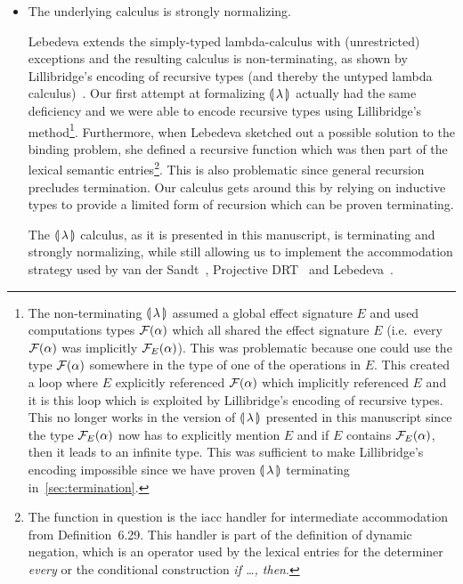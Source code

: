 \begin{itemize}
\item The underlying calculus is strongly normalizing.

  Lebedeva extends the simply-typed lambda-calculus with (unrestricted)
  exceptions and the resulting calculus is non-terminating, as shown by
  Lillibridge's encoding of recursive types (and thereby the untyped lambda
  calculus)~\cite{lillibridge1995exceptions}. Our first attempt at
  formalizing ${\llparenthesis \, \lambda \, \rrparenthesis}$ actually had the same deficiency and we were able to
  encode recursive types using Lillibridge's method\footnote{The
    non-terminating ${\llparenthesis \, \lambda \, \rrparenthesis}$ assumed a global effect signature $E$ and used
    computations types $\mathcal{F}(\alpha)$ which all shared the effect signature
    $E$ (i.e.\ every $\mathcal{F}(\alpha)$ was implicitly $\mathcal{F}_E(\alpha)$). This
    was problematic because one could use the type $\mathcal{F}(\alpha)$ somewhere
    in the type of one of the operations in $E$. This created a loop where
    $E$ explicitly referenced $\mathcal{F}(\alpha)$ which implicitly referenced $E$
    and it is this loop which is exploited by Lillibridge's encoding of
    recursive types. This no longer works in the version of ${\llparenthesis \, \lambda \, \rrparenthesis}$
    presented in this manuscript since the type $\mathcal{F}_E(\alpha)$ now has to
    explicitly mention $E$ and if $E$ contains $\mathcal{F}_E(\alpha)$, then it
    leads to an infinite type. This was sufficient to make Lillibridge's
    encoding impossible since we have proven ${\llparenthesis \, \lambda \, \rrparenthesis}$ terminating
    in~\ref{sec:termination}.}. Furthermore, when Lebedeva sketched out a
  possible solution to the binding problem, she defined a recursive
  function which was then part of the lexical semantic entries\footnote{The
    function in question is the $\mathrm{iacc}$ handler for intermediate
    accommodation from Definition~6.29. This handler is part of the
    definition of dynamic negation, which is an operator used by the
    lexical entries for the determiner \emph{every} or the conditional
    construction \emph{if \ldots, then}.}. This is also problematic since
  general recursion precludes termination. Our calculus gets around this by
  relying on inductive types to provide a limited form of recursion which
  can be proven terminating.

  The ${\llparenthesis \, \lambda \, \rrparenthesis}$ calculus, as it is presented in this manuscript, is
  terminating and strongly normalizing, while still allowing us to
  implement the accommodation strategy used by van der
  Sandt~\cite{van1992presupposition}, Projective
  DRT~\cite{venhuizen2013parsimonious} and
  Lebedeva~\cite{lebedeva2012expression}.


\end{itemize}
